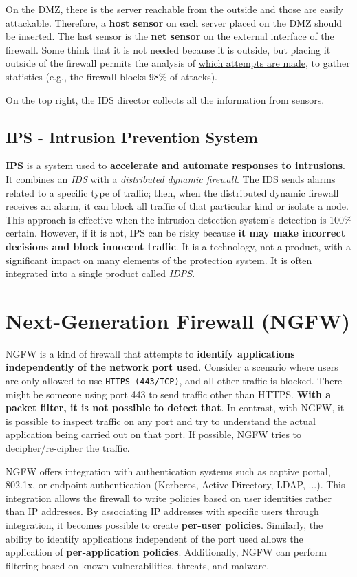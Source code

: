 On the DMZ, there is the server reachable from the outside and those are easily attackable. Therefore, a \textbf{host sensor} on each server placed on the DMZ should be inserted. The last sensor is the \textbf{net sensor} on the external interface of the firewall. Some think that it is not needed because it is outside, but placing it outside of the firewall permits the analysis of \underline{which attempts are made}, to gather statistics (e.g., the firewall blocks 98\% of attacks).

On the top right, the IDS director collects all the information from sensors.

\subsection{IPS - Intrusion Prevention System}

\textbf{IPS} is a system used to \textbf{accelerate and automate responses to intrusions}. It combines an \textit{IDS} with a \textit{distributed dynamic firewall}. The IDS sends alarms related to a specific type of traffic; then, when the distributed dynamic firewall receives an alarm, it can block all traffic of that particular kind or isolate a node. This approach is effective when the intrusion detection system's detection is 100\% certain. However, if it is not, IPS can be risky because \textbf{it may make incorrect decisions and block innocent traffic}. It is a technology, not a product, with a significant impact on many elements of the protection system.
It is often integrated into a single product called \textit{IDPS}.



\section{Next-Generation Firewall (NGFW)}
NGFW is a kind of firewall that attempts to \textbf{identify applications independently of the network port used}.
Consider a scenario where users are only allowed to use \texttt{HTTPS (443/TCP)}, and all other traffic is blocked. There might be someone using port 443 to send traffic other than HTTPS. \textbf{With a packet filter, it is not possible to detect that}. In contrast, with NGFW, it is possible to inspect traffic on any port and try to understand the actual application being carried out on that port. If possible, NGFW tries to decipher/re-cipher the traffic.

NGFW offers integration with authentication systems such as captive portal, 802.1x, or endpoint authentication (Kerberos, Active Directory, LDAP, ...). This integration allows the firewall to write policies based on user identities rather than IP addresses. By associating IP addresses with specific users through integration, it becomes possible to create \textbf{per-user policies}. Similarly, the ability to identify applications independent of the port used allows the application of \textbf{per-application policies}. Additionally, NGFW can perform filtering based on known vulnerabilities, threats, and malware.


